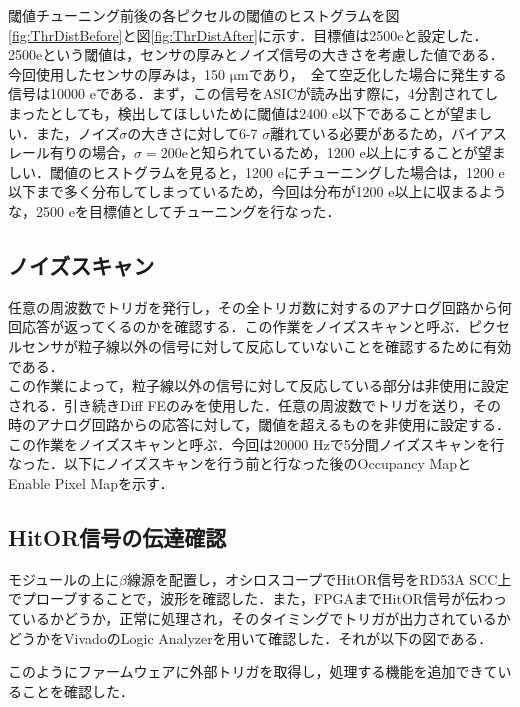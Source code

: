 閾値チューニング前後の各ピクセルの閾値のヒストグラムを図\ref{fig:ThrDistBefore}と図\ref{fig:ThrDistAfter}に示す．目標値は2500$\mathrm{e}$と設定した．\\
2500$\mathrm{e}$という閾値は，センサの厚みとノイズ信号の大きさを考慮した値である．今回使用したセンサの厚みは，150 $\mathrm{\mu m}$であり，　全て空乏化した場合に発生する信号は10000 $\mathrm{e}$である．まず，この信号をASICが読み出す際に，4分割されてしまったとしても，検出してほしいために閾値は2400 $\mathrm{e}$以下であることが望ましい．また，ノイズ$\sigma$の大きさに対して6-7 $\sigma$離れている必要があるため，バイアスレール有りの場合，$\sigma = 200 \mathrm{e}$と知られているため，1200 $\mathrm{e}$以上にすることが望ましい．閾値のヒストグラムを見ると，1200 $\mathrm{e}$にチューニングした場合は，1200 $\mathrm{e}$以下まで多く分布してしまっているため，今回は分布が1200 $\mathrm{e}$以上に収まるような，2500 $\mathrm{e}$を目標値としてチューニングを行なった．


\subsection{ノイズスキャン}
任意の周波数でトリガを発行し，その全トリガ数に対するのアナログ回路から何回応答が返ってくるのかを確認する．この作業をノイズスキャンと呼ぶ．ピクセルセンサが粒子線以外の信号に対して反応していないことを確認するために有効である．\\
この作業によって，粒子線以外の信号に対して反応している部分は非使用に設定される．引き続きDiff FEのみを使用した．任意の周波数でトリガを送り，その時のアナログ回路からの応答に対して，閾値を超えるものを非使用に設定する．この作業をノイズスキャンと呼ぶ．今回は20000 $\mathrm{Hz}$で5分間ノイズスキャンを行なった．以下にノイズスキャンを行う前と行なった後のOccupancy MapとEnable Pixel Mapを示す．

\subsection{HitOR信号の伝達確認}
モジュールの上に$\beta$線源を配置し，オシロスコープでHitOR信号をRD53A SCC上でプローブすることで，波形を確認した．また，FPGAまでHitOR信号が伝わっているかどうか，正常に処理され，そのタイミングでトリガが出力されているかどうかをVivadoのLogic Analyzerを用いて確認した．それが以下の図である．



このようにファームウェアに外部トリガを取得し，処理する機能を追加できていることを確認した．






